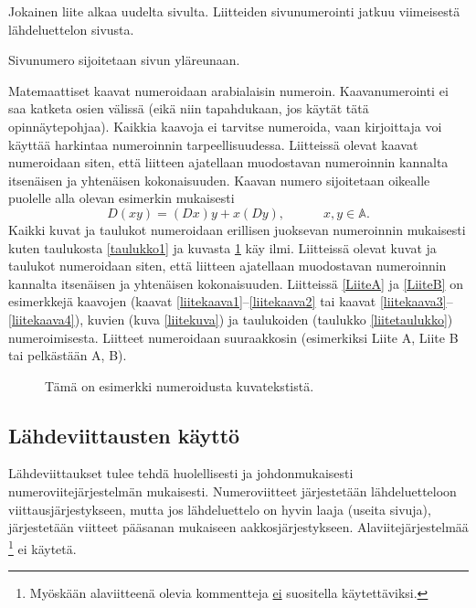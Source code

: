 \documentclass[finnish, 12pt, a4paper, sci, utf8, pdfa]{aaltothesis}
\begin{document}
Jokainen liite alkaa uudelta sivulta. Liitteiden sivunumerointi
jatkuu viimeisestä lähdeluettelon sivusta.

Sivunumero sijoitetaan sivun yläreunaan.

Matemaattiset kaavat numeroidaan arabialaisin
numeroin. Kaavanumerointi ei saa katketa osien välissä (eikä niin
tapahdukaan, jos käytät tätä opinnäytepohjaa). Kaikkia kaavoja ei tarvitse
numeroida, vaan kirjoittaja voi käyttää harkintaa numeroinnin
tarpeellisuudessa.  Liitteissä olevat kaavat numeroidaan siten, että
liitteen ajatellaan muodostavan numeroinnin kannalta itsenäisen ja
yhtenäisen kokonaisuuden. Kaavan numero sijoitetaan oikealle puolelle
alla olevan esimerkin mukaisesti
\begin{equation}
D(xy) = (Dx)y + x(Dy),  \hspace{3em} x,y \in \mathbb{A}.
\end{equation}
Kaikki kuvat ja taulukot numeroidaan erillisen juoksevan numeroinnin
mukaisesti kuten taulukosta \ref{taulukko1} ja kuvasta \ref{kuva1} käy
ilmi.  Liitteissä olevat kuvat ja taulukot numeroidaan siten, että
liitteen ajatellaan muodostavan numeroinnin kannalta itsenäisen ja
yhtenäisen kokonaisuuden. Liitteissä \ref{LiiteA} ja \ref{LiiteB} on
esimerkkejä kaavojen (kaavat \ref{liitekaava1}--\ref{liitekaava2} tai
kaavat \ref{liitekaava3}--\ref{liitekaava4}), kuvien (kuva
\ref{liitekuva}) ja taulukoiden (taulukko \ref{liitetaulukko})
numeroimisesta.  Liitteet numeroidaan suuraakkosin (esimerkiksi Liite
A, Liite B tai pelkästään A, B).
\begin{figure}[htb]
\centering
\caption{Tämä on esimerkki numeroidusta kuvatekstistä. \label{kuva1}}
\end{figure}

\subsection*{Lähdeviittausten käyttö} 

Lähdeviittaukset tulee tehdä huolellisesti ja johdonmukaisesti
numeroviitejärjestelmän mukaisesti. Numeroviitteet järjestetään
lähdeluetteloon viittausjärjestykseen, mutta jos lähdeluettelo
on hyvin laaja (useita sivuja), järjestetään viitteet pääsanan 
mukaiseen aakkosjärjestykseen. Alaviitejärjestelmää
\footnote{Myöskään alaviitteenä olevia kommentteja \underline{ei} suositella
käytettäviksi.} ei käytetä. 
\end{document}
